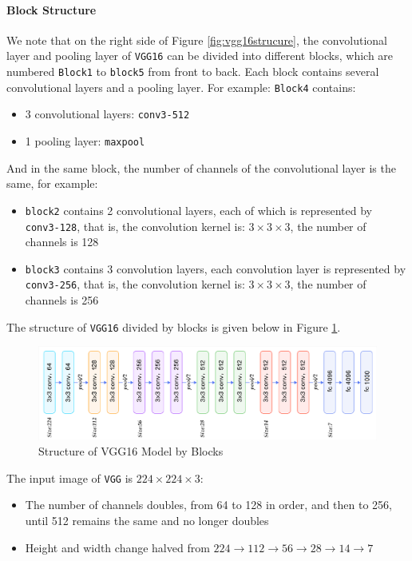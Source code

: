 \paragraph{Block Structure}
We note that on the right side of Figure \ref{fig:vgg16strucure}, the convolutional layer and pooling layer of \verb|VGG16| can be divided into different blocks, which are numbered \verb|Block1| to \verb|block5| from front to back. Each block contains several convolutional layers and a pooling layer. For example: \verb|Block4| contains:
\begin{itemize}
    \item 3 convolutional layers: \verb|conv3-512|
    \item 1 pooling layer: \verb|maxpool|
\end{itemize}

And in the same block, the number of channels of the convolutional layer is the same, for example:
\begin{itemize}
    \item \verb|block2| contains 2 convolutional layers, each of which is represented by \verb|conv3-128|, that is, the convolution kernel is: $3\times3\times3$, the number of channels is 128
    \item \verb|block3| contains 3 convolution layers, each convolution layer is represented by \verb|conv3-256|, that is, the convolution kernel is: $3\times3\times3$, the number of channels is 256
\end{itemize}

The structure of \verb|VGG16| divided by blocks is given below in Figure \ref{fig:vgg16blockstrucure}.

\begin{figure}[h!]
\centering
\includegraphics[width=.9\textwidth]{vgg16blockstruc.pdf}
\caption{Structure of VGG16 Model by Blocks \cite{vgg16}}
\label{fig:vgg16blockstrucure}
\end{figure}

The input image of \verb|VGG| is $224\times224\times3$:
\begin{itemize}
    \item The number of channels doubles, from 64 to 128 in order, and then to 256, until 512 remains the same and no longer doubles
    \item Height and width change halved from $224 \to 112 \to 56 \to 28 \to 14 \to 7$
\end{itemize}









